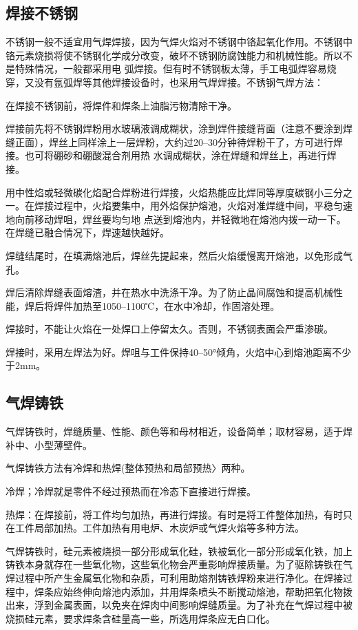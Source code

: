 \documentclass{ctexbook}
\begin{document}
\subsection{焊接不锈钢}
不锈钢一般不适宜用气焊焊接，因为气焊火焰对不锈钢中铬起氧化作用。不锈钢中铬元素烧损将使不锈钢化学成分改变，破坏不锈钢防腐蚀能力和机械性能。所以不是特殊情况，一般都采用电
弧焊接。但有时不锈钢板太薄，手工电弧焊容易烧穿，又没有氩弧焊等其他焊接设备时，也采用气焊焊接。不锈钢气焊方法：

在焊接不锈钢前，将焊件和焊条上油脂污物清除干净。

焊接前先将不锈钢焊粉用水玻璃液调成糊状，涂到焊件接缝背面（注意不要涂到焊缝正面），焊丝上同样涂上一层焊粉，大约过20--30分钟待焊粉干了，方可进行焊接。也可将硼砂和硼酸混合剂用热
水调成糊状，涂在焊缝和焊丝上，再进行焊接。

用中性焰或轻微碳化焰配合焊粉进行焊接，火焰热能应比焊同等厚度碳钢小三分之一。在焊接过程中，火焰要集中，用外焰保护熔池，火焰对准焊缝中间，平稳匀速地向前移动焊咀，焊丝要均匀地
点送到熔池内，并轻微地在熔池内拨一动一下。在焊缝已融合情况下，焊速越快越好。

焊缝结尾时，在填满熔池后，焊丝先提起来，然后火焰缓慢离开熔池，以免形成气孔。

焊后清除焊缝表面熔渣，并在热水中洗涤干净。为了防止晶间腐蚀和提高机械性能，焊后将焊件加热至1050--1100℃，在水中冷却，作固溶处理。

焊接时，不能让火焰在一处焊口上停留太久。否则，不锈钢表面会严重渗碳。

焊接时，采用左焊法为好。焊咀与工件保持40--50°倾角，火焰中心到熔池距离不少于2mm。
\subsection{气焊铸铁}
气焊铸铁时，焊缝质量、性能、颜色等和母材相近，设备简单；取材容易，适于焊补中、小型薄壁件。

气焊铸铁方法有冷焊和热焊(整体预热和局部预热〉两种。

冷焊；冷焊就是零件不经过预热而在冷态下直接进行焊接。

热焊：在焊接前，将工件均匀加热，再进行焊接。有时是将工件整体加热，有时只在工件局部加热。工件加热有用电炉、木炭炉或气焊火焰等多种方法。

气焊铸铁时，硅元素被烧损一部分形成氧化硅，铁被氧化一部分形成氧化铁，加上铸铁本身就存在一些氧化物，这些氧化物会严重影响焊接质量。为了驱除铸铁在气焊过程中所产生金属氧化物和杂质，可利用助熔剂铸铁焊粉来进行净化。在焊接过程中，焊条应始终伸向熔池内添加，并用焊条喷头不断搅动熔池，帮助把氧化物拨出来，浮到金属表面，以免夹在焊肉中间影响焊缝质量。为了补充在气焊过程中被烧损硅元素，要求焊条含硅量高一些，所选用焊条应无白口化。
\end{document}
